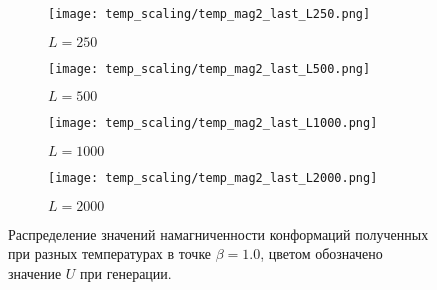 \begin{figure}[ht]
	\centering
    \begin{subfigure}[t]{0.4\textwidth}
        \texttt{[image: temp\_scaling/temp\_mag2\_last\_L250.png]}
        \caption*{$L = 250$}
    \end{subfigure} 
    \begin{subfigure}[t]{0.4\textwidth}
        \texttt{[image: temp\_scaling/temp\_mag2\_last\_L500.png]}
        \caption*{$L = 500$}

    \end{subfigure}
    \begin{subfigure}[t]{0.4\textwidth}
        \texttt{[image: temp\_scaling/temp\_mag2\_last\_L1000.png]}
        \caption*{$L = 1000$}
    \end{subfigure}
    \begin{subfigure}[t]{0.4\textwidth}
        \texttt{[image: temp\_scaling/temp\_mag2\_last\_L2000.png]}
        \caption*{$L = 2000$}
    \end{subfigure}
	\caption{Распределение значений намагниченности конформаций полученных при разных температурах в точке $\beta = 1.0$, цветом обозначено значение $U$ при генерации.}
	\label{fig:temp_scaling_mag2_last}
\end{figure}